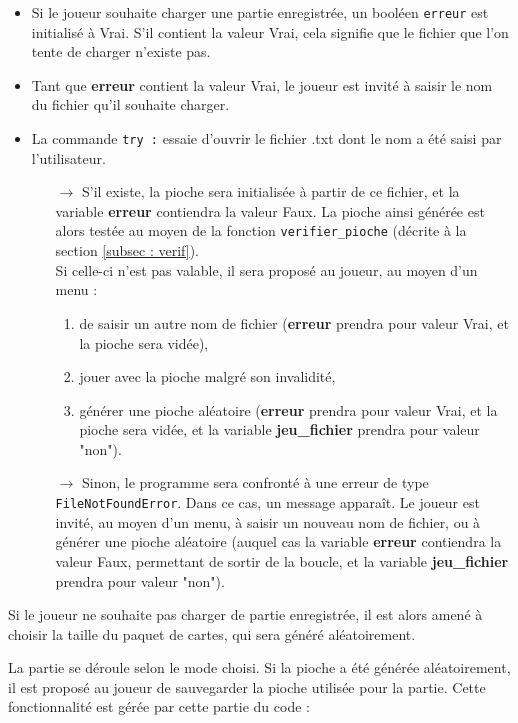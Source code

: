 \documentclass[titlepage]{article}
\begin{document}
	\begin{itemize}
	\item Si le joueur souhaite charger une partie enregistrée, un booléen \texttt{erreur} est initialisé à Vrai. S'il contient la valeur Vrai, cela signifie que le fichier que l'on tente de charger n'existe pas. 
	\item Tant que \textbf{erreur} contient la valeur Vrai, le joueur est invité à saisir le nom du fichier qu'il souhaite charger.
	\item La commande \texttt{try :} essaie d'ouvrir le fichier .txt dont le nom a été saisi par l'utilisateur. 
		\begin{itemize}
		\item[$\rightarrow$] S'il existe, la pioche sera initialisée à partir de ce fichier, et la variable \textbf{erreur} contiendra la valeur Faux. La pioche ainsi générée est alors testée au moyen de la fonction \texttt{verifier\_pioche} (décrite à la section \ref{subsec : verif}).\\ Si celle-ci n'est pas valable, il sera proposé au joueur, au moyen d'un menu : 
			\begin{enumerate}
			\item de saisir un autre nom de fichier (\textbf{erreur} prendra pour valeur Vrai, et la pioche sera vidée), 
			\item jouer avec la pioche malgré son invalidité, 
			\item générer une pioche aléatoire (\textbf{erreur} prendra pour valeur Vrai, et la pioche sera vidée, et la variable \textbf{jeu\_fichier} prendra pour valeur "non").
			\end{enumerate}
		\item[$\rightarrow$] Sinon, le programme sera confronté à une erreur de type \texttt{FileNotFoundError}. Dans ce cas, un message apparaît. Le joueur est invité, au moyen d'un menu, à saisir un nouveau nom de fichier, ou à générer une pioche aléatoire (auquel cas la variable \textbf{erreur} contiendra la valeur Faux, permettant de sortir de la boucle, et la variable \textbf{jeu\_fichier} prendra pour valeur "non").
		\end{itemize}
	\end{itemize}
	\par
\bigskip	
Si le joueur ne souhaite pas charger de partie enregistrée, il est alors amené à choisir la taille du paquet de cartes, qui sera généré aléatoirement. \par
\bigskip
La partie se déroule selon le mode choisi. Si la pioche a été générée aléatoirement, il est proposé au joueur de sauvegarder la pioche utilisée pour la partie. Cette fonctionnalité est gérée par cette partie du code :
\end{document}

